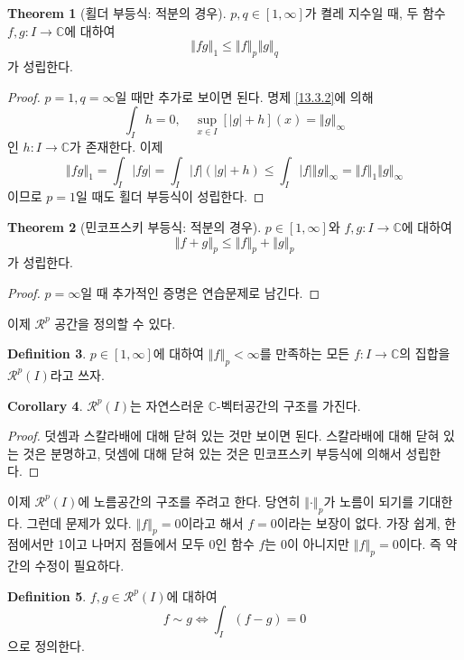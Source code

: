 \documentclass[11pt]{book}
\numberwithin{equation}{chapter}
\def\CC{\mathbb{C}}
\def\calR{\mathcal{R}}
\newcommand{\abs}[1]{\left\vert#1\right\vert}
\newcommand{\norm}[1]{\left\Vert#1\right\Vert}
\theoremstyle{definition}
\newtheorem{thm}{Theorem}[section]
\newtheorem{cor}[thm]{Corollary}
\newtheorem{defn}[thm]{Definition}
\begin{document}
\begin{thm}[횔더 부등식: 적분의 경우]
    \(p, q \in [1, \infty]\)가 켤레 지수일 때, 두 함수 \(f, g : I \to \CC\)에 대하여
    \[
    \norm{fg}_1 \le \norm{f}_p \norm{g}_q    
    \]
    가 성립한다.
\end{thm}
\begin{proof}
    \(p = 1, q = \infty\)일 때만 추가로 보이면 된다. 명제 \ref{13.3.2}에 의해
    \[
    \int_I h = 0, \quad \sup_{x \in I} [\abs{g} + h](x) = \norm{g}_{\infty}       
    \]
    인 \(h : I \to \CC\)가 존재한다. 이제
    \[
        \norm{fg}_1 = \int_I \abs{fg} = \int_I \abs{f}(\abs{g} + h) \le \int_I \abs{f} \norm{g}_{\infty} = \norm{f}_1 \norm{g}_{\infty}
    \]
    이므로 \(p = 1\)일 때도 횔더 부등식이 성립한다.
\end{proof}

\begin{thm}[민코프스키 부등식: 적분의 경우]
    \(p \in [1, \infty]\)와 \(f, g : I \to \CC\)에 대하여
    \[
    \norm{f+g}_p \le \norm{f}_p + \norm{g}_p    
    \]
    가 성립한다.
\end{thm}
\begin{proof}
    \(p = \infty\)일 때 추가적인 증명은 연습문제로 남긴다.
\end{proof}

이제 \(\calR^p\) 공간을 정의할 수 있다.

\begin{defn}
    \(p \in [1, \infty]\)에 대하여 \(\norm{f}_p < \infty\)를 만족하는 모든 \(f : I \to \CC\)의 집합을 \(\calR^p(I)\)라고 쓰자.
\end{defn}

\begin{cor}
    \(\calR^p(I)\)는 자연스러운 \(\CC\)-벡터공간의 구조를 가진다.
\end{cor}
\begin{proof}
    덧셈과 스칼라배에 대해 닫혀 있는 것만 보이면 된다. 스칼라배에 대해 닫혀 있는 것은 분명하고, 덧셈에 대해 닫혀 있는 것은 민코프스키 부등식에 의해서 성립한다.
\end{proof}

이제 \(\calR^p(I)\)에 노름공간의 구조를 주려고 한다. 당연히 \(\norm{\cdot}_p\)가 노름이 되기를 기대한다. 그런데 문제가 있다. \(\norm{f}_p = 0\)이라고 해서 \(f = 0\)이라는 보장이 없다. 가장 쉽게, 한 점에서만 1이고 나머지 점들에서 모두 0인 함수 \(f\)는 0이 아니지만 \(\norm{f}_p = 0\)이다. 즉 약간의 수정이 필요하다.

\begin{defn}
    \(f, g \in \calR^p(I)\)에 대하여
    \[
    f \sim g  \iff \int_I (f - g) = 0
    \]
    으로 정의한다.
\end{defn}
\end{document}

